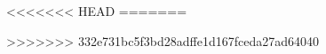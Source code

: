 
\newcommand{\kLanguage}{eng}

\newcommand{\kLoesungen}{false}

\newcommand{\kAufgabenNiveau}{auchTraining}

\newcommand{\kMMPapier}{false}

<<<<<<< HEAD
=======
\newcommand{\kVersion}{V0.0.1 Nov. 2023}



\newcommand{\kDraftKommentare}{true}

>>>>>>> 332e731bc5f3bd28adffe1d167fceda27ad64040
